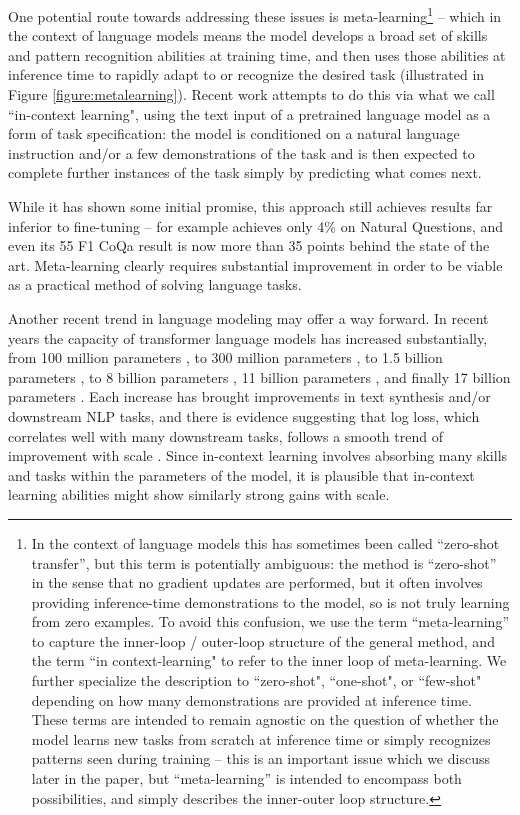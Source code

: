 \documentclass{article}
\begin{document}
One potential route towards addressing these issues is meta-learning\footnote{In the context of language models this has sometimes been called ``zero-shot transfer'', but this term is potentially ambiguous: the method is ``zero-shot'' in the sense that no gradient updates are performed, but it often involves providing inference-time demonstrations to the model, so is not truly learning from zero examples.  To avoid this confusion, we use the term ``meta-learning'' to capture the inner-loop / outer-loop structure of the general method, and the term ``in context-learning" to refer to the inner loop of meta-learning. We further specialize the description to ``zero-shot", ``one-shot", or ``few-shot" depending on how many demonstrations are provided at inference time.  These terms are intended to remain agnostic on the question of whether the model learns new tasks from scratch at inference time or simply recognizes patterns seen during training -- this is an important issue which we discuss later in the paper, but ``meta-learning'' is intended to encompass both possibilities, and simply describes the inner-outer loop structure.} -- which in the context of language models means the model develops a broad set of skills and pattern recognition abilities at training time, and then uses those abilities at inference time to rapidly adapt to or recognize the desired task (illustrated in Figure \ref{figure:metalearning}). Recent work \cite{radford2019language} attempts to do this via what we call ``in-context learning", using the text input of a pretrained language model as a form of task specification: the model is conditioned on a natural language instruction and/or a few demonstrations of the task and is then expected to complete further instances of the task simply by predicting what comes next.


While it has shown some initial promise, this approach still achieves results far inferior to fine-tuning -- for example \cite{radford2019language} achieves only 4\% on Natural Questions, and even its 55 F1 CoQa result is now more than 35 points behind the state of the art.  Meta-learning clearly requires substantial improvement in order to be viable as a practical method of solving language tasks.

Another recent trend in language modeling may offer a way forward.  In recent years the capacity of transformer language models has increased substantially, from 100 million parameters \cite{radford2018gpt1}, to 300 million parameters \cite{devlin2018bert}, to 1.5 billion parameters \cite{radford2019language}, to 8 billion parameters \cite{shoeybi2019megatronlm}, 11 billion parameters \cite{raffel2019t5}, and finally 17 billion parameters \cite{turing_17m}.  Each increase has brought improvements in text synthesis and/or downstream NLP tasks, and there is evidence suggesting that log loss, which correlates well with many downstream tasks, follows a smooth trend of improvement with scale \cite{kaplan2020scaling}.  Since in-context learning involves absorbing many skills and tasks within the parameters of the model, it is plausible that in-context learning abilities might show similarly strong gains with scale.
\end{document}
